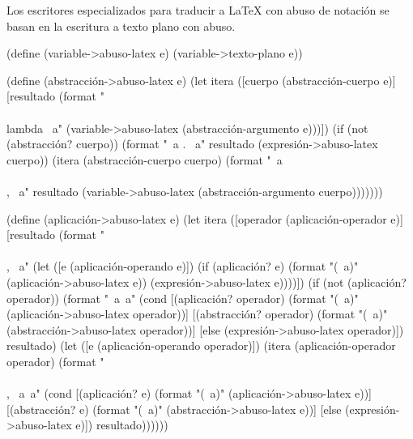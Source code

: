 \documentclass[letterpaper,twoside,openright,11pt]{book}
\begin{document}
Los escritores especializados para traducir a \LaTeX{} con abuso de notación se basan en la escritura a texto plano con abuso.

\nwenddocs{}\plusendmoddef
(define (variable->abuso-latex e)
  (variable->texto-plano e))

(define (abstracción->abuso-latex e)
  (let itera ([cuerpo (abstracción-cuerpo e)]
              [resultado (format "\\\\lambda ~a"
                                 (variable->abuso-latex (abstracción-argumento e)))])
    (if (not (abstracción? cuerpo))
        (format "~a . ~a" resultado (expresión->abuso-latex cuerpo))
        (itera (abstracción-cuerpo cuerpo)
               (format "~a\\\\, ~a"
                       resultado
                       (variable->abuso-latex (abstracción-argumento cuerpo)))))))

(define (aplicación->abuso-latex e)
  (let itera ([operador (aplicación-operador e)]
              [resultado (format "\\\\, ~a"
                                 (let ([e (aplicación-operando e)])
                                   (if (aplicación? e)
                                       (format "(~a)" (aplicación->abuso-latex e))
                                       (expresión->abuso-latex e))))])
    (if (not (aplicación? operador))
        (format "~a~a"
                (cond [(aplicación? operador)
                       (format "(~a)" (aplicación->abuso-latex operador))]
                      [(abstracción? operador)
                       (format "(~a)" (abstracción->abuso-latex operador))]
                      [else
                       (expresión->abuso-latex operador)])
                resultado)
        (let ([e (aplicación-operando operador)])
          (itera (aplicación-operador operador)
                 (format "\\\\, ~a~a"
                         (cond [(aplicación? e)
                                (format "(~a)" (aplicación->abuso-latex e))]
                               [(abstracción? e)
                                (format "(~a)" (abstracción->abuso-latex e))]
                               [else
                                (expresión->abuso-latex e)])
                         resultado))))))
\end{document}
